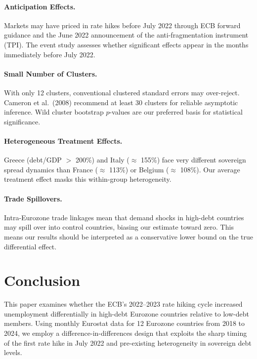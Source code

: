 \documentclass[12pt,a4paper]{article}
\begin{document}
\paragraph{Anticipation Effects.} Markets may have priced in rate hikes before July 2022 through ECB forward guidance and the June 2022 announcement of the anti-fragmentation instrument (TPI). The event study assesses whether significant effects appear in the months immediately before July 2022.

\paragraph{Small Number of Clusters.} With only 12 clusters, conventional clustered standard errors may over-reject. Cameron et al.\ (2008) recommend at least 30 clusters for reliable asymptotic inference. Wild cluster bootstrap $p$-values are our preferred basis for statistical significance.

\paragraph{Heterogeneous Treatment Effects.} Greece (debt/GDP $>$ 200\%) and Italy ($\approx$ 155\%) face very different sovereign spread dynamics than France ($\approx$ 113\%) or Belgium ($\approx$ 108\%). Our average treatment effect masks this within-group heterogeneity.

\paragraph{Trade Spillovers.} Intra-Eurozone trade linkages mean that demand shocks in high-debt countries may spill over into control countries, biasing our estimate toward zero. This means our results should be interpreted as a conservative lower bound on the true differential effect.

\section{Conclusion}

This paper examines whether the ECB's 2022--2023 rate hiking cycle increased unemployment differentially in high-debt Eurozone countries relative to low-debt members. Using monthly Eurostat data for 12 Eurozone countries from 2018 to 2024, we employ a difference-in-differences design that exploits the sharp timing of the first rate hike in July 2022 and pre-existing heterogeneity in sovereign debt levels.
\end{document}

